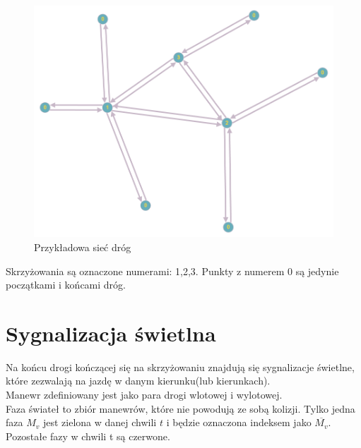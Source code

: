 \documentclass[12pt]{book}
\begin{document}
\begin{minipage}{12cm}
\begin{figure}[H]
\includegraphics[width=12cm]{network}
\caption{\label{fig:network} Przykładowa sieć dróg}
\end{figure}
\end{minipage} \hfill
\begin{minipage}{5cm}
Skrzyżowania są oznaczone numerami: 1,2,3.
Punkty z numerem 0 są jedynie początkami i końcami dróg.
\end{minipage}
\section{Sygnalizacja świetlna}
Na końcu drogi kończącej się na skrzyżowaniu znajdują się sygnalizacje świetlne, które zezwalają na jazdę w danym kierunku(lub kierunkach). \\
Manewr zdefiniowany jest jako para drogi wlotowej i wylotowej.\\ Faza świateł to zbiór manewrów, które nie powodują ze sobą kolizji. Tylko jedna faza $M_v$ jest zielona w danej chwili $t$ i będzie oznaczona indeksem jako $\overline{M_v}$. Pozostałe fazy w chwili t są czerwone.
\newpage
\end{document}

